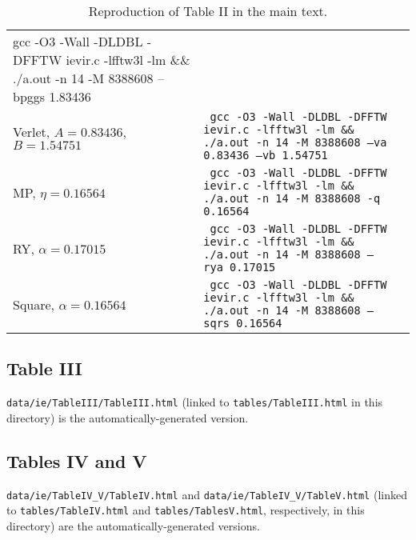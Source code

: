 \documentclass[preprint]{revtex4-1}
\numberwithin{equation}{subsection}
\numberwithin{table}{section}
\begin{document}
\begin{table}
\begin{tabular}{p{3cm} p{11cm} p{2cm}}
{    gcc -O3 -Wall -DLDBL -DFFTW ievir.c -lfftw3l -lm
    \newline
    \&\& ./a.out -n 14 -M 8388608 --bpggs 1.83436
  }
  &
  \\
  Verlet, \newline
  $A = 0.83436$, \newline
  $B = 1.54751$
  &
  \texttt{
    gcc -O3 -Wall -DLDBL -DFFTW ievir.c -lfftw3l -lm
    \newline
    \&\& ./a.out -n 14 -M 8388608 --va 0.83436 --vb 1.54751
  }
  &
  \\
  MP, \newline
  $\eta = 0.16564$
  &
  \texttt{
    gcc -O3 -Wall -DLDBL -DFFTW ievir.c -lfftw3l -lm
    \newline
    \&\& ./a.out -n 14 -M 8388608 -q 0.16564
  }
  &
  \\
  RY, \newline
  $\alpha = 0.17015$
  &
  \texttt{
    gcc -O3 -Wall -DLDBL -DFFTW ievir.c -lfftw3l -lm
    \newline
    \&\& ./a.out -n 14 -M 8388608 --rya 0.17015
  }
  &
  \\
  Square, \newline
  $\alpha = 0.16564$
  &
  \texttt{
    gcc -O3 -Wall -DLDBL -DFFTW ievir.c -lfftw3l -lm
    \newline
    \&\& ./a.out -n 14 -M 8388608 --sqrs 0.16564
  }
  &
  \\
  \hline
  \end{tabular}
  \caption{
    \label{tab:reprod_TableII}
    Reproduction of Table II in the main text.
  }
\end{table}



\subsection{Table III}

\texttt{data/ie/TableIII/TableIII.html}
(linked to \texttt{tables/TableIII.html} in this directory)
is the automatically-generated version.



\subsection{Tables IV and V}

\texttt{data/ie/TableIV\_V/TableIV.html}
and
\texttt{data/ie/TableIV\_V/TableV.html}
(linked to \texttt{tables/TableIV.html} and \texttt{tables/TablesV.html},
respectively, in this directory)
are the automatically-generated versions.
\end{document}
